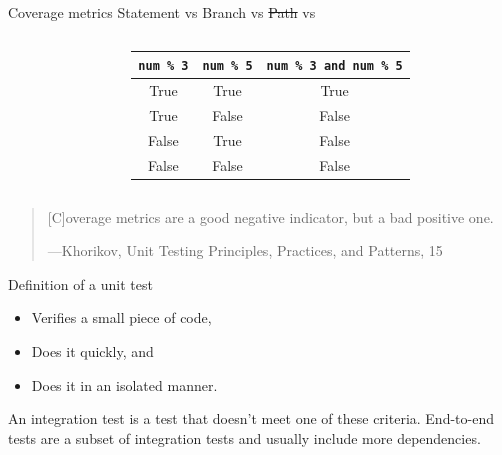 \documentclass[english,10pt,aspectratio=169,t]{beamer}
\begin{document}
\begin{frame}{Coverage metrics}
  Statement vs Branch vs \sout{Path} vs 
  \begin{columns}[T]
    \begin{column}[]{0.5\textwidth}
      \begin{minipage}{\linewidth}
        \coveragecode
      \end{minipage}
    \end{column}
    \begin{column}[]{0.5\textwidth}
      \begin{center}
        \begin{tabular}{ ccc }
          \hline
          \texttt{num \% 3} & \texttt{num \% 5} & \texttt{num \% 3 and num \% 5} \\
          \hline
          True & True & True \\
          True & False & False \\
          False & True & False \\
          False & False & False \\
          \hline
        \end{tabular}
      \end{center}
    \end{column}
  \end{columns}
\end{frame}

\begin{frame}
  \vfill
  \begin{quote}
    [C]overage metrics are a good negative indicator, but a bad positive one.
    \begin{flushright}
      \tiny{---Khorikov, \textup{Unit Testing Principles, Practices, and Patterns}, 15}
    \end{flushright}
  \end{quote}
  \vfill
\end{frame}

\begin{frame}{Definition of a unit test}
  \begin{itemize}
    \item Verifies a small piece of code,
    \item Does it quickly, and
    \item Does it in an isolated manner.
  \end{itemize}

  An integration test is a test that doesn't meet one of these criteria. End-to-end
  tests are a subset of integration tests and usually include more dependencies.
\end{frame}
\end{document}
